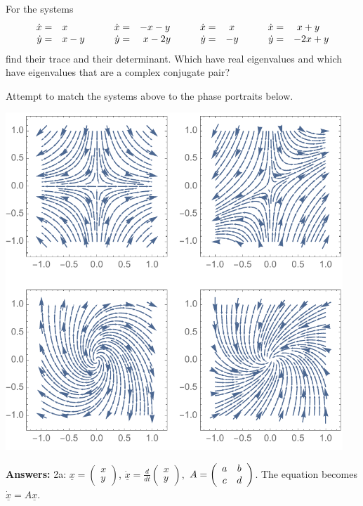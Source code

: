 \documentclass[12pt,letterpaper,noanswers]{exam}
\begin{document}
\begin{questions}
\begin{parts}
For the systems
\[ 
\begin{array}{ r l c r l c r l c r l c}
 \dot{x} =  &x  & \quad & \dot{x} = &-x - y & \quad & \dot{x} = &\ x & \quad & \dot{x} =&\ x + y \\
 \dot{y} = &x- y & \quad & \dot{y} = &\ x - 2y & \quad & \dot{y} = &- y & & \dot{y} = &-2x + y\\
\end{array}\]
find their trace and their determinant.  Which have real eigenvalues and which have eigenvalues that are a complex conjugate pair?

\item Attempt to match the systems above to the phase portraits below.

\includegraphics[width=5in]{img/VectorFields.pdf}

\end{parts}
\eject 
\textbf{Answers:}
2a: $\displaystyle \underline{x} = \left(\begin{array}{c} x \\ y \end{array}\right)$, $\displaystyle \dot{\underline{x}} = \frac{d}{dt}\left(\begin{array}{c} x \\ y \end{array}\right),$ $A = \left(\begin{array}{c c} a & b \\ c & d \end{array}\right)$.  The equation becomes $\dot{\underline{x}} = A\underline{x}$.


\end{questions}
\end{document}
